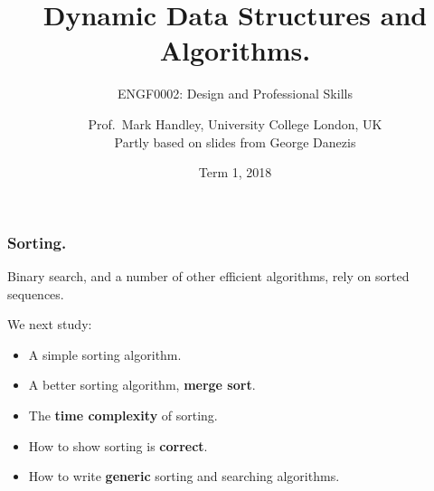 \documentclass{beamer} %
\author{Prof.\ Mark Handley, University College London, UK\\
\tiny{Partly based on slides from George Danezis}}
\title{Dynamic Data Structures and Algorithms.}
\subtitle{ENGF0002: Design and Professional Skills }
\date{Term 1, 2018}
\newcommand\emc[1]{\textcolor{midred}{\textbf{#1}}}
\begin{document}
\nobibliography*


\frame{
\titlepage
}

\begin{frame}
\frametitle{Sorting.}

Binary search, and a number of other efficient algorithms, rely on sorted sequences. 

\vspace{3mm}
We next study:
\begin{itemize}
	\item A simple sorting algorithm. %
	\item A better sorting algorithm, \emc{merge sort}.
	\item The \emc{time complexity} of sorting.
	\item How to show sorting is \emc{correct}.
	\item How to write \emc{generic} sorting and searching algorithms.
\end{itemize}

\end{frame}
\end{document}
